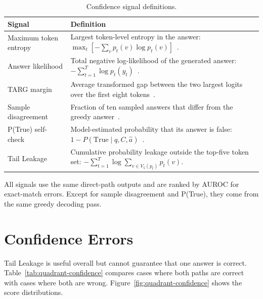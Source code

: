 \begin{table}[h]
    \centering
    \caption[Confidence Signal Definitions]{Confidence signal definitions.}
    \label{tab:confidence-signal-definitions}
    \setlength{\tabcolsep}{8pt}
    \begin{tabular}{ >{\raggedright\arraybackslash}p{} >{\raggedright\arraybackslash}p{} }
        \toprule
        Signal & Definition \\
        \midrule
        Maximum token entropy
        & Largest token-level entropy in the answer: $\max_t[-\sum_v p_t(v)\log p_t(v)]$~\cite{maqa,targ}. \\
        \addlinespace
        Answer likelihood
        & Total negative log-likelihood of the generated answer: $-\sum_{t=1}^{T}\log p_t(y_t)$~\cite{semanticuncertainty}. \\
        \addlinespace
        TARG margin
        & Average transformed gap between the two largest logits over the first eight tokens~\cite{targ}. \\
        \addlinespace
        Sample disagreement
        & Fraction of ten sampled answers that differ from the greedy answer~\cite{maqa,semanticuncertainty,semanticentropy}. \\
        \addlinespace
        P(True) self-check
        & Model-estimated probability that its answer is false: $1-P(\mathrm{True}\mid q,C,\hat a)$~\cite{kadavath2022}. \\
        \addlinespace
        Tail Leakage
        & Cumulative probability leakage outside the top-five token set: $-\sum_{t=1}^{T}\log\sum_{v\in V_5(p_t)}p_t(v)$. \\
        \bottomrule
    \end{tabular}
\end{table}

All signals use the same direct-path outputs and are ranked by AUROC for exact-match errors. Except for sample disagreement and P(True), they come from the same greedy decoding pass.

\clearpage
\section{Confidence Errors}
\label{app:confidence-diagnostics}

Tail Leakage is useful overall but cannot guarantee that one answer is correct. Table~\ref{tab:quadrant-confidence} compares cases where both paths are correct with cases where both are wrong. Figure~\ref{fig:quadrant-confidence} shows the score distributions.

